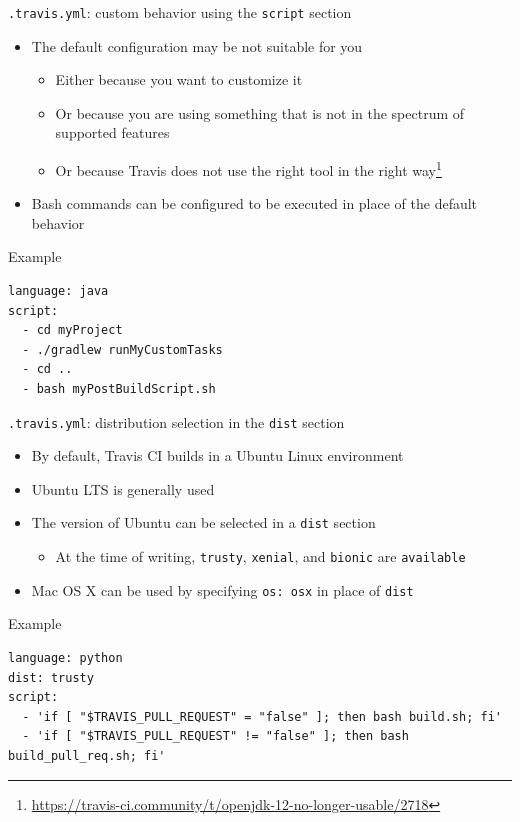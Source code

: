 \documentclass[presentation]{beamer}
\begin{document}
\begin{frame}[fragile]{\texttt{.travis.yml}: custom behavior using the \texttt{script} section}
    \begin{itemize}
        \item The default configuration may be not suitable for you
        \begin{itemize}
            \item Either because you want to customize it
            \item Or because you are using something that is not in the spectrum of supported features
            \item Or because Travis does not use the right tool in the right way\footnote{\url{https://travis-ci.community/t/openjdk-12-no-longer-usable/2718}}
        \end{itemize}
        \item Bash commands can be configured to be executed in place of the default behavior
    \end{itemize}
    \begin{block}{Example}
        \begin{verbatim}
language: java
script:
  - cd myProject
  - ./gradlew runMyCustomTasks
  - cd ..
  - bash myPostBuildScript.sh
        \end{verbatim}
    \end{block}
\end{frame}

\begin{frame}[fragile]{\texttt{.travis.yml}: distribution selection in the \texttt{dist} section}
    \begin{itemize}
        \item By default, Travis CI builds in a Ubuntu Linux environment
        \item Ubuntu LTS is generally used
        \item The version of Ubuntu can be selected in a \texttt{dist} section
        \begin{itemize}
            \item At the time of writing, \texttt{trusty}, \texttt{xenial}, and \texttt{bionic} are \texttt{available}
        \end{itemize}
        \item Mac OS X can be used by specifying \texttt{os: osx} in place of \texttt{dist}
    \end{itemize}
    \begin{block}{Example}
        \begin{verbatim}
language: python
dist: trusty
script:
  - 'if [ "$TRAVIS_PULL_REQUEST" = "false" ]; then bash build.sh; fi'
  - 'if [ "$TRAVIS_PULL_REQUEST" != "false" ]; then bash build_pull_req.sh; fi'
        \end{verbatim}
    \end{block}
\end{frame}
\end{document}
